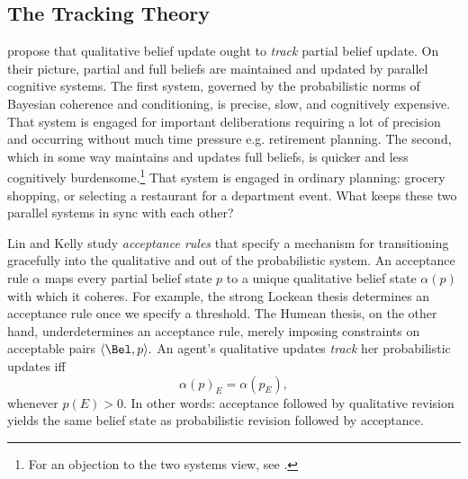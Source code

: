 \subsection{The Tracking Theory}

\citet{lin2012propositional} propose that qualitative belief update ought to
{\em track} partial belief update. On their picture, partial and full beliefs
are maintained and updated by parallel cognitive systems. The first system,
governed by the probabilistic norms of Bayesian coherence and conditioning, is
precise, slow, and cognitively expensive. That system is engaged for important
deliberations requiring a lot of precision and occurring without much time
pressure e.g. retirement planning. The second, which in some way maintains and
updates full beliefs, is quicker and less cognitively burdensome.\footnote{For
an objection to the two systems view, see \citet{staffel2018beliefs}. } That
system is engaged in ordinary planning: grocery shopping, or selecting a
restaurant for a department event. What keeps these two parallel systems in sync
with each other?

Lin and Kelly study {\em acceptance rules} that specify a mechanism for
transitioning gracefully into the qualitative and out of the probabilistic
system. An acceptance rule $\alpha$ maps every partial belief state $p$ to a
unique qualitative belief state $\alpha(p)$ with which it coheres. For example,
the strong Lockean thesis determines an acceptance rule once we specify a
threshold. The Humean thesis, on the other hand, underdetermines an acceptance
rule, merely imposing constraints on acceptable pairs $\langle \Bel, p \rangle.$
An agent's qualitative updates {\em track} her probabilistic updates iff
$$\alpha(p)_E=\alpha(p_E),$$ whenever $p(E)>0$. In other words: acceptance
followed by qualitative revision yields the same belief state as probabilistic
revision followed by acceptance.


